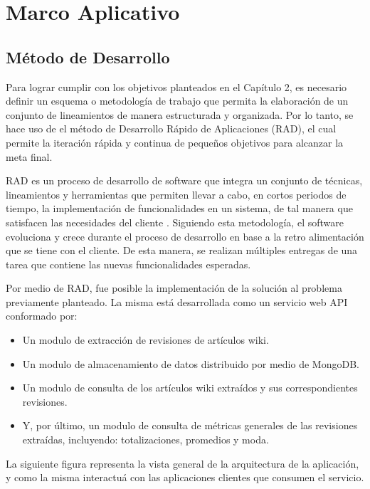 \section{Marco Aplicativo}

\subsection{Método de Desarrollo}

Para lograr cumplir con los objetivos planteados en el Capítulo 2, es necesario definir un
esquema o metodología de trabajo que permita la elaboración de un conjunto de
lineamientos de manera estructurada y organizada. Por lo tanto, se hace uso de el método de 
Desarrollo Rápido de Aplicaciones (RAD), el cual permite la iteración rápida y continua
de pequeños objetivos para alcanzar la meta final.

RAD es un proceso de desarrollo de software que
integra un conjunto de técnicas, lineamientos y herramientas que permiten llevar a cabo, en
cortos periodos de tiempo, la implementación de funcionalidades en un sistema, de tal manera que
satisfacen las necesidades del cliente \cite{23}. Siguiendo esta metodología, el software
evoluciona y crece durante el proceso de desarrollo en base a la retro alimentación que
se tiene con el cliente. De esta manera, se realizan múltiples entregas de una tarea que
contiene las nuevas funcionalidades esperadas.

Por medio de RAD, fue posible la implementación de la solución al problema previamente planteado.
La misma está desarrollada como un servicio web API conformado por:

\begin{itemize}

\item Un modulo de extracción de revisiones de artículos wiki.

\item Un modulo de almacenamiento de datos distribuido por medio de MongoDB.

\item Un modulo de consulta de los artículos wiki extraídos y sus correspondientes revisiones.

\item Y, por último, un modulo de consulta de métricas generales de las revisiones extraídas, incluyendo: totalizaciones, promedios y moda.

\end{itemize}

La siguiente figura representa la vista general de la arquitectura de la aplicación, y como la misma interactuá con
las aplicaciones clientes que consumen el servicio.

